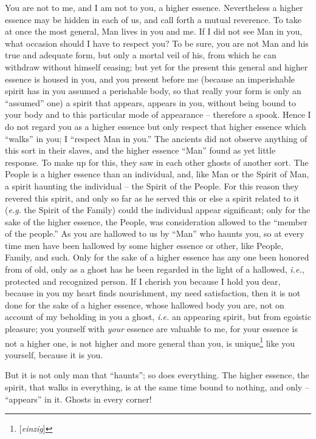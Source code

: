 You are not to me, and I am not to you, a higher essence. Nevertheless a 
higher essence may be hidden in each of us, and call forth a mutual reverence. 
To take at once the most general, Man lives in you and me. If I did not see 
Man in you, what occasion should I have to respect you? To be sure, you are 
not Man and his true and adequate form, but only a mortal veil of his, from 
which he can withdraw without himself ceasing; but yet for the present this 
general and higher essence is housed in you, and you present before me 
(because an imperishable spirit has in you assumed a perishable body, so that 
really your form is only an ``assumed'' one) a spirit that appears, appears 
in you, without being bound to your body and to this particular mode of 
appearance -- therefore a spook. Hence I do not regard you as a higher essence 
but only respect that higher essence which ``walks'' in you; I ``respect 
Man in you.'' The ancients did not observe anything of this sort in their 
slaves, and the higher essence ``Man'' found as yet little response. To make 
up for this, they saw in each other ghosts of another sort. The People is a 
higher essence than an individual, and, like Man or the Spirit of Man, a 
spirit haunting the individual -- the Spirit of the People. For this reason 
they revered this spirit, and only so far as he served this or else a spirit 
related to it (\textit{e.g.} the Spirit of the Family) could the individual 
appear significant; only for the sake of the higher essence, the People, was 
consideration allowed to the ``member of the people.'' As you are hallowed 
to us by ``Man'' who haunts you, so at every time men have been hallowed by 
some higher essence or other, like People, Family, and such. Only for the sake 
of a higher essence has any one been honored from of old, only as a ghost has 
he been regarded in the light of a hallowed, \textit{i.e.}, protected and 
recognized person. If I cherish you because I hold you dear, because in you my 
heart finds nourishment, my need satisfaction, then it is not done for the 
sake of a higher essence, whose hallowed body you are, not on account of my 
beholding in you a ghost, \textit{i.e.} an appearing spirit, but from egoistic 
pleasure; you yourself with \textit{your} essence are valuable to me, for your 
essence is not a higher one, is not higher and more general than you, is 
unique\footnote{[\textit{einzig}]} like you yourself, because it is you.

But it is not only man that ``haunts''; so does everything. The higher 
essence, the spirit, that walks in everything, is at the same time bound to 
nothing, and only -- ``appears'' in it. Ghosts in every corner!

